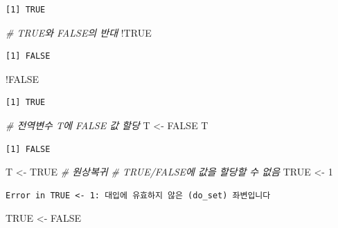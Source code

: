 \documentclass[
  11pt,
]{krantz}
\newenvironment{Shaded}{\begin{snugshade}}{\end{snugshade}}
\newcommand{\CommentTok}[1]{\textcolor[rgb]{0.37,0.37,0.37}{\textit{#1}}}
\newcommand{\ConstantTok}[1]{\textcolor[rgb]{0,0,0}{#1}}
\newcommand{\DecValTok}[1]{\textcolor[rgb]{0.06,0.06,0.06}{#1}}
\newcommand{\NormalTok}[1]{#1}
\newcommand{\OtherTok}[1]{\textcolor[rgb]{0.37,0.37,0.37}{#1}}
\newcommand{\SpecialCharTok}[1]{\textcolor[rgb]{0,0,0}{#1}}
\begin{document}
\begin{verbatim}
[1] TRUE
\end{verbatim}

\begin{Shaded}
\begin{Highlighting}[]
\CommentTok{\# TRUE와 FALSE의 반대}
\SpecialCharTok{!}\ConstantTok{TRUE}
\end{Highlighting}
\end{Shaded}

\begin{verbatim}
[1] FALSE
\end{verbatim}

\begin{Shaded}
\begin{Highlighting}[]
\SpecialCharTok{!}\ConstantTok{FALSE}
\end{Highlighting}
\end{Shaded}

\begin{verbatim}
[1] TRUE
\end{verbatim}

\begin{Shaded}
\begin{Highlighting}[]
\CommentTok{\# 전역변수 T에 FALSE 값 할당}
\NormalTok{T }\OtherTok{\textless{}{-}} \ConstantTok{FALSE}
\NormalTok{T}
\end{Highlighting}
\end{Shaded}

\begin{verbatim}
[1] FALSE
\end{verbatim}

\begin{Shaded}
\begin{Highlighting}[]
\NormalTok{T }\OtherTok{\textless{}{-}} \ConstantTok{TRUE}  \CommentTok{\# 원상복귀}
\CommentTok{\# TRUE/FALSE에 값을 할당할 수 없음}
\ConstantTok{TRUE} \OtherTok{\textless{}{-}} \DecValTok{1}
\end{Highlighting}
\end{Shaded}

\begin{verbatim}
Error in TRUE <- 1: 대입에 유효하지 않은 (do_set) 좌변입니다
\end{verbatim}

\begin{Shaded}
\begin{Highlighting}[]
\ConstantTok{TRUE} \OtherTok{\textless{}{-}} \ConstantTok{FALSE}
\end{Highlighting}
\end{Shaded}
\end{document}
